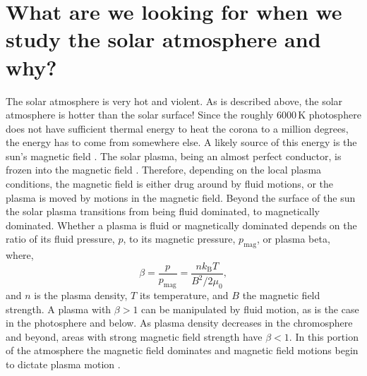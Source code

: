  
\section{What are we looking for when we study the solar atmosphere and why?}
The solar atmosphere is very hot and violent.
As is described above, the solar atmosphere is hotter than the solar surface!
Since the roughly 6000\,K photosphere does not have sufficient thermal energy to heat the corona to a million degrees, the energy has to come from somewhere else. 
A likely source of this energy is the sun's magnetic field \citep{Priest2014}.
The solar plasma, being an almost perfect conductor, is frozen into the magnetic field \citep{Priest2014}.
Therefore, depending on the local plasma conditions, the magnetic field is either drug around by fluid motions, or the plasma is moved by motions in the magnetic field.
Beyond the surface of the sun the solar plasma transitions from being fluid dominated, to magnetically dominated.
Whether a plasma is fluid or magnetically dominated depends on the ratio of its fluid pressure, $p$, to its magnetic pressure, $p_\text{mag}$, or plasma beta, where,
\begin{equation}
	\beta = \frac{p}{p_\text{mag}} = \frac{nk_\text{B}T}{B^2 / 2\mu_0},
\end{equation}
and $n$ is the plasma density, $T$ its temperature, and $B$ the magnetic field strength.
A plasma with $\beta>1$ can be manipulated by fluid motion, as is the case in the photosphere and below.
As plasma density decreases in the chromosphere and beyond, areas with strong magnetic field strength have $\beta<1$.  
In this portion of the atmosphere the magnetic field dominates and magnetic field motions begin to dictate plasma motion \citep{Priest2014}.


